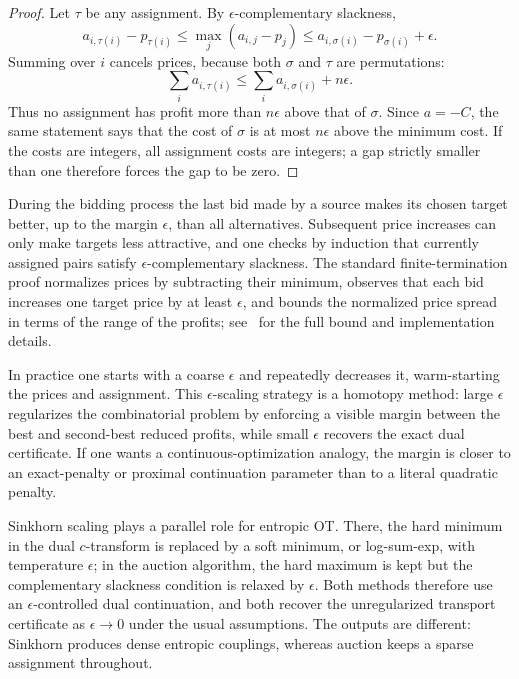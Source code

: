 \begin{proof}
	Let $\tau$ be any assignment. By $\epsilon$-complementary slackness,
	\[
		a_{i,\tau(i)}-p_{\tau(i)}
		\leq
		\max_j(a_{i,j}-p_j)
		\leq
		a_{i,\sigma(i)}-p_{\sigma(i)}+\epsilon.
	\]
	Summing over $i$ cancels prices, because both $\sigma$ and $\tau$ are permutations:
	\[
		\sum_i a_{i,\tau(i)}
		\leq
		\sum_i a_{i,\sigma(i)}+n\epsilon.
	\]
	Thus no assignment has profit more than $n\epsilon$ above that of $\sigma$. Since $a=-C$, the same statement says that the cost of $\sigma$ is at most $n\epsilon$ above the minimum cost. If the costs are integers, all assignment costs are integers; a gap strictly smaller than one therefore forces the gap to be zero.
\end{proof}

During the bidding process the last bid made by a source makes its chosen target better, up to the margin $\epsilon$, than all alternatives. Subsequent price increases can only make targets less attractive, and one checks by induction that currently assigned pairs satisfy $\epsilon$-complementary slackness. The standard finite-termination proof normalizes prices by subtracting their minimum, observes that each bid increases one target price by at least $\epsilon$, and bounds the normalized price spread in terms of the range of the profits; see~\cite{bertsekas1992auction,merigot2020optimaltransportalgorithms} for the full bound and implementation details.

\begin{rem}
	In practice one starts with a coarse $\epsilon$ and repeatedly decreases it, warm-starting the prices and assignment. This $\epsilon$-scaling strategy is a homotopy method: large $\epsilon$ regularizes the combinatorial problem by enforcing a visible margin between the best and second-best reduced profits, while small $\epsilon$ recovers the exact dual certificate. If one wants a continuous-optimization analogy, the margin is closer to an exact-penalty or proximal continuation parameter than to a literal quadratic penalty.

	Sinkhorn scaling plays a parallel role for entropic OT. There, the hard minimum in the dual $c$-transform is replaced by a soft minimum, or log-sum-exp, with temperature $\epsilon$; in the auction algorithm, the hard maximum is kept but the complementary slackness condition is relaxed by $\epsilon$. Both methods therefore use an $\epsilon$-controlled dual continuation, and both recover the unregularized transport certificate as $\epsilon\to0$ under the usual assumptions. The outputs are different: Sinkhorn produces dense entropic couplings, whereas auction keeps a sparse assignment throughout.
\end{rem}

